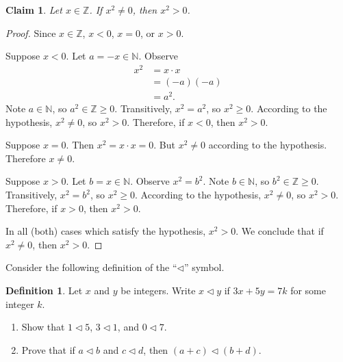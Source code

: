 \documentclass{article}
\newtheorem*{claim}{Claim}
\theoremstyle{definition}
\newtheorem*{definition}{Definition}
\begin{document}
\begin{solution}
\begin{claim}
Let $x\in\mathbb{Z}$. If $x^2\neq 0$, then $x^2>0$.
\end{claim}\begin{proof}
Since $x\in\mathbb{Z}$, $x<0$, $x=0$, or $x>0$.

Suppose $x<0$. Let $a=-x\in\mathbb{N}$. Observe
\begin{align}
x^2
&=x\cdot x\\
&=(-a)(-a)\\
&=a^2.
\end{align}
Note $a\in\mathbb{N}$, so $a^2\in\mathbb{Z}\geq 0$. Transitively, $x^2=a^2$, so $x^2\geq 0$. According to the hypothesis, $x^2\neq 0$, so $x^2>0$. Therefore, if $x<0$, then $x^2>0$.

Suppose $x=0$. Then $x^2=x\cdot x=0$. But $x^2\neq 0$ according to the hypothesis. Therefore $x\neq 0$.

Suppose $x>0$. Let $b=x\in\mathbb{N}$. Observe $x^2=b^2$. Note $b\in\mathbb{N}$, so $b^2\in\mathbb{Z}\geq 0$. Transitively, $x^2=b^2$, so $x^2\geq 0$.  According to the hypothesis, $x^2\neq 0$, so $x^2>0$. Therefore, if $x>0$, then $x^2>0$.

In all (both) cases which satisfy the hypothesis, $x^2>0$. We conclude that if $x^2\neq 0$, then $x^2>0$.
\end{proof}
\end{solution}
\begin{question}
    Consider the following definition of the ``$\triangleleft$'' symbol.
	\begin{definition}
	 Let $x$ and $y$ be integers. Write $x\triangleleft y$ if $3x+5y=7k$ for some integer $k$.
	\end{definition}
        \begin{enumerate}
           \item Show that $1\triangleleft 5$, $3\triangleleft 1$, and $0\triangleleft 7$.
           \item Prove that if $a\triangleleft b$ and $c\triangleleft d$, then $(a+c) \triangleleft (b+d)$.
        \end{enumerate}
\end{question}
\end{document}
